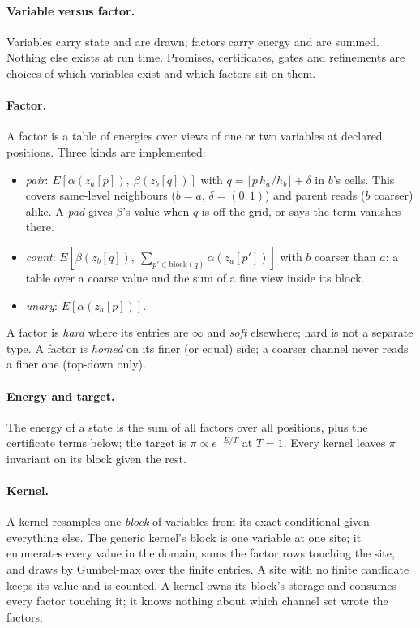 \documentclass[11pt]{article}
\newcommand{\1}{\mathds{1}}
\begin{document}
\paragraph{Variable versus factor.} Variables carry state and are drawn;
factors carry energy and are summed. Nothing else exists at run time.
Promises, certificates, gates and refinements are choices of which
variables exist and which factors sit on them.

\paragraph{Factor.} A factor is a table of energies over views of one or
two variables at declared positions. Three kinds are implemented:
\begin{itemize}
\item \emph{pair}: $E[\alpha(z_a[p]),\ \beta(z_b[q])]$ with
  $q = \lfloor p\, h_a / h_b \rfloor + \delta$ in $b$'s cells. This covers
  same-level neighbours ($b = a$, $\delta = (0, 1)$) and parent reads
  ($b$ coarser) alike. A \emph{pad} gives $\beta$'s value when $q$ is off
  the grid, or says the term vanishes there.
\item \emph{count}: $E[\beta(z_b[q]),\ \sum_{p' \in \text{block}(q)}
  \alpha(z_a[p'])]$ with $b$ coarser than $a$: a table over a coarse value
  and the sum of a fine view inside its block.
\item \emph{unary}: $E[\alpha(z_a[p])]$.
\end{itemize}
A factor is \emph{hard} where its entries are $\infty$ and \emph{soft}
elsewhere; hard is not a separate type. A factor is \emph{homed} on its
finer (or equal) side; a coarser channel never reads a finer one
(top-down only).

\paragraph{Energy and target.} The energy of a state is the sum of all
factors over all positions, plus the certificate terms below; the target
is $\pi \propto e^{-E/T}$ at $T = 1$. Every kernel leaves $\pi$ invariant on
its block given the rest.

\paragraph{Kernel.} A kernel resamples one \emph{block} of variables from
its exact conditional given everything else. The generic kernel's block is
one variable at one site; it enumerates every value in the domain, sums
the factor rows touching the site, and draws by Gumbel-max over the finite
entries. A site with no finite candidate keeps its value and is counted.
A kernel owns its block's storage and consumes every factor touching it;
it knows nothing about which channel set wrote the factors.
\end{document}
